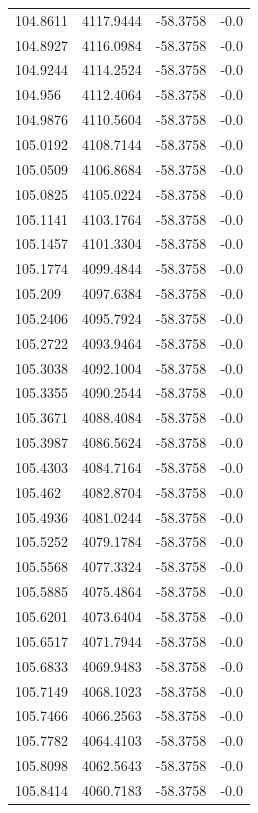 \begin{table}[H]
\begin{tabular}{llll}
104.8611 & 4117.9444 & -58.3758 & -0.0 \\
104.8927 & 4116.0984 & -58.3758 & -0.0 \\
104.9244 & 4114.2524 & -58.3758 & -0.0 \\
104.956 & 4112.4064 & -58.3758 & -0.0 \\
104.9876 & 4110.5604 & -58.3758 & -0.0 \\
105.0192 & 4108.7144 & -58.3758 & -0.0 \\
105.0509 & 4106.8684 & -58.3758 & -0.0 \\
105.0825 & 4105.0224 & -58.3758 & -0.0 \\
105.1141 & 4103.1764 & -58.3758 & -0.0 \\
105.1457 & 4101.3304 & -58.3758 & -0.0 \\
105.1774 & 4099.4844 & -58.3758 & -0.0 \\
105.209 & 4097.6384 & -58.3758 & -0.0 \\
105.2406 & 4095.7924 & -58.3758 & -0.0 \\
105.2722 & 4093.9464 & -58.3758 & -0.0 \\
105.3038 & 4092.1004 & -58.3758 & -0.0 \\
105.3355 & 4090.2544 & -58.3758 & -0.0 \\
105.3671 & 4088.4084 & -58.3758 & -0.0 \\
105.3987 & 4086.5624 & -58.3758 & -0.0 \\
105.4303 & 4084.7164 & -58.3758 & -0.0 \\
105.462 & 4082.8704 & -58.3758 & -0.0 \\
105.4936 & 4081.0244 & -58.3758 & -0.0 \\
105.5252 & 4079.1784 & -58.3758 & -0.0 \\
105.5568 & 4077.3324 & -58.3758 & -0.0 \\
105.5885 & 4075.4864 & -58.3758 & -0.0 \\
105.6201 & 4073.6404 & -58.3758 & -0.0 \\
105.6517 & 4071.7944 & -58.3758 & -0.0 \\
105.6833 & 4069.9483 & -58.3758 & -0.0 \\
105.7149 & 4068.1023 & -58.3758 & -0.0 \\
105.7466 & 4066.2563 & -58.3758 & -0.0 \\
105.7782 & 4064.4103 & -58.3758 & -0.0 \\
105.8098 & 4062.5643 & -58.3758 & -0.0 \\
105.8414 & 4060.7183 & -58.3758 & -0.0 \\

\end{tabular}
\end{table}
